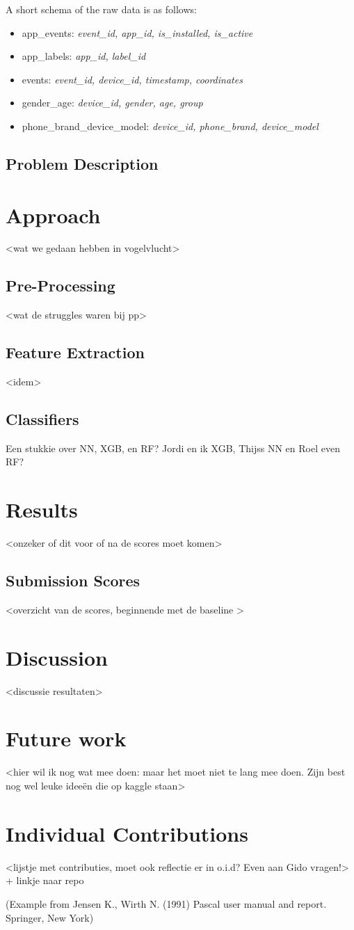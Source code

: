\documentclass[runningheads,a4paper]{llncs}
\begin{document}
A short schema of the raw data is as follows:
\begin{itemize}
\item app\_events: \textit{event\_id, app\_id, is\_installed, is\_active}
\item app\_labels: \textit{app\_id, label_id}
\item events: \textit{event\_id, device\_id, timestamp, coordinates}
\item gender\_age: \textit{device\_id, gender, age, group}
\item phone\_brand\_device\_model: \textit{device\_id, phone\_brand, device\_model}
\end{itemize}

\subsection{Problem Description}
\section{Approach}
<wat we gedaan hebben in vogelvlucht>
\subsection{Pre-Processing}
<wat de struggles waren bij pp>
\subsection{Feature Extraction}
<idem>
\subsection{Classifiers}
Een stukkie over NN, XGB, en RF? Jordi en ik XGB, Thijss NN en Roel even RF?
\section{Results}
<onzeker of dit voor of na de scores moet komen>
\subsection{Submission Scores}
<overzicht van de scores, beginnende met de baseline >
\section{Discussion}
<discussie resultaten>
\section{Future work}
<hier wil ik nog wat mee doen: maar het moet niet te lang mee doen. Zijn best nog wel leuke ideeën die op kaggle staan>
\section{Individual Contributions}
<lijstje met contributies, moet ook reflectie er in o.i.d? Even aan Gido vragen!>
+ linkje naar repo
\medskip


{\small (Example from Jensen K., Wirth N. (1991) Pascal user manual and
report. Springer, New York)}


\nocite{*} 
\end{document}
